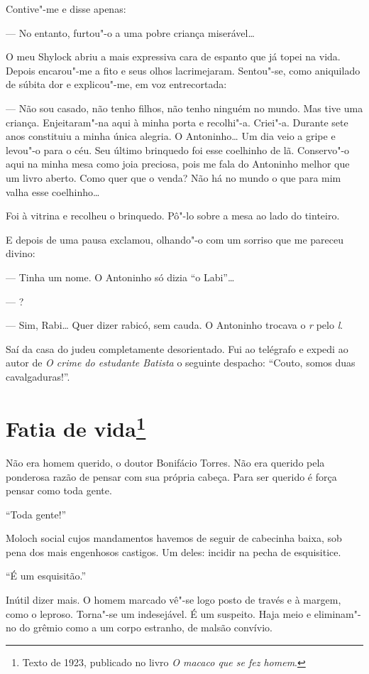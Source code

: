 Contive"-me e disse apenas:

--- No entanto, furtou"-o a uma pobre criança miserável\ldots{}

O meu Shylock abriu a mais expressiva cara de espanto que já topei na
vida. Depois encarou"-me a fito e seus olhos lacrimejaram. Sentou"-se,
como aniquilado de súbita dor e explicou"-me, em voz entrecortada:

--- Não sou casado, não tenho filhos, não tenho ninguém no mundo. Mas
tive uma criança. Enjeitaram"-na aqui à minha porta e recolhi"-a. Criei"-a.
Durante sete anos constituiu a minha única alegria. O Antoninho\ldots{} Um
dia veio a gripe e levou"-o para o céu. Seu último brinquedo foi esse
coelhinho de lã. Conservo"-o aqui na minha mesa como joia preciosa, pois
me fala do Antoninho melhor que um livro aberto. Como quer que o venda?
Não há no mundo o que para mim valha esse coelhinho\ldots{}

Foi à vitrina e recolheu o brinquedo. Pô"-lo sobre a mesa ao lado do
tinteiro.

E depois de uma pausa exclamou, olhando"-o com um sorriso que me pareceu
divino:

--- Tinha um nome. O Antoninho só dizia ``o Labi''\ldots{}

--- ?

--- Sim, Rabi\ldots{} Quer dizer rabicó, sem cauda. O Antoninho trocava o
\emph{r} pelo \emph{l}.

Saí da casa do judeu completamente desorientado. Fui ao telégrafo e
expedi ao autor de \emph{O crime do estudante Batista} o seguinte
despacho: ``Couto, somos duas cavalgaduras!''.

\chapter{Fatia de vida\footnote[*]{Texto de 1923, publicado no livro \emph{O macaco que se fez homem}.}}


Não era homem querido, o doutor Bonifácio Torres. Não era querido pela
ponderosa razão de pensar com sua própria cabeça. Para ser querido é
força pensar como toda gente.

``Toda gente!''

Moloch social cujos mandamentos havemos de seguir de cabecinha baixa,
sob pena dos mais engenhosos castigos. Um deles: incidir na pecha de
esquisitice.

``É um esquisitão.''

Inútil dizer mais. O homem marcado vê"-se logo posto de través e à
margem, como o leproso. Torna"-se um indesejável. É um suspeito. Haja
meio e eliminam"-no do grêmio como a um corpo estranho, de malsão
convívio.

